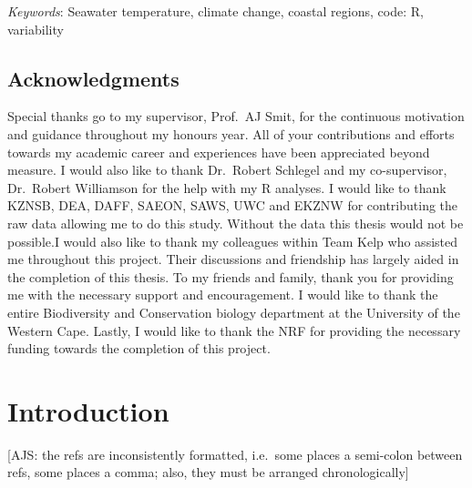 \documentclass[12pt,A4paper,]{article}
\begin{document}
\emph{Keywords}: Seawater temperature, climate change, coastal regions,
code: R, variability

\newpage

\subsection{Acknowledgments}\label{acknowledgments}

Special thanks go to my supervisor, Prof.~AJ Smit, for the continuous
motivation and guidance throughout my honours year. All of your
contributions and efforts towards my academic career and experiences
have been appreciated beyond measure. I would also like to thank
Dr.~Robert Schlegel and my co-supervisor, Dr.~Robert Williamson for the
help with my R analyses. I would like to thank KZNSB, DEA, DAFF, SAEON,
SAWS, UWC and EKZNW for contributing the raw data allowing me to do this
study. Without the data this thesis would not be possible.I would also
like to thank my colleagues within Team Kelp who assisted me throughout
this project. Their discussions and friendship has largely aided in the
completion of this thesis. To my friends and family, thank you for
providing me with the necessary support and encouragement. I would like
to thank the entire Biodiversity and Conservation biology department at
the University of the Western Cape. Lastly, I would like to thank the
NRF for providing the necessary funding towards the completion of this
project.

\newpage

\section{Introduction}\label{introduction}

{[}AJS: the refs are inconsistently formatted, i.e.~some places a
semi-colon between refs, some places a comma; also, they must be
arranged chronologically{]}
\end{document}
